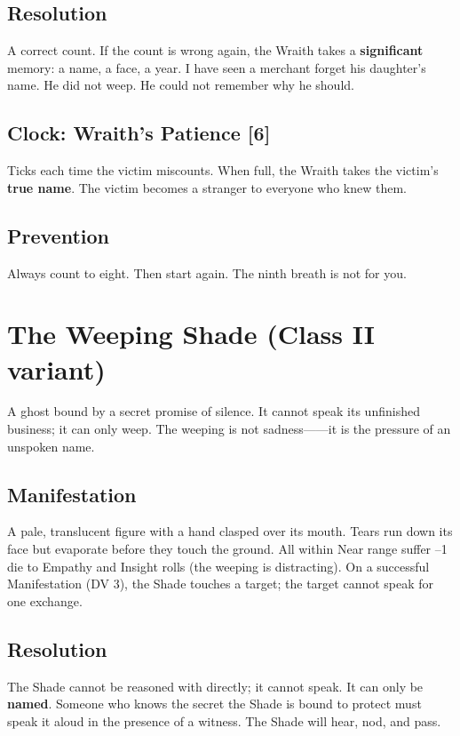 \subsection{Resolution}

A correct count. If the count is wrong again, the Wraith takes a \textbf{significant} memory: a name, a face, a year. I have seen a merchant forget his daughter's name. He did not weep. He could not remember why he should.

\subsection{Clock: Wraith's Patience [6]}

Ticks each time the victim miscounts. When full, the Wraith takes the victim's \textbf{true name}. The victim becomes a stranger to everyone who knew them.

\subsection{Prevention}

Always count to eight. Then start again. The ninth breath is not for you.

\section{The Weeping Shade (Class II variant)}

A ghost bound by a secret promise of silence. It cannot speak its unfinished business; it can only weep. The weeping is not sadness------it is the pressure of an unspoken name.

\subsection{Manifestation}

A pale, translucent figure with a hand clasped over its mouth. Tears run down its face but evaporate before they touch the ground. All within Near range suffer --1 die to Empathy and Insight rolls (the weeping is distracting). On a successful Manifestation (DV 3), the Shade touches a target; the target cannot speak for one exchange.

\subsection{Resolution}

The Shade cannot be reasoned with directly; it cannot speak. It can only be \textbf{named}. Someone who knows the secret the Shade is bound to protect must speak it aloud in the presence of a witness. The Shade will hear, nod, and pass.

